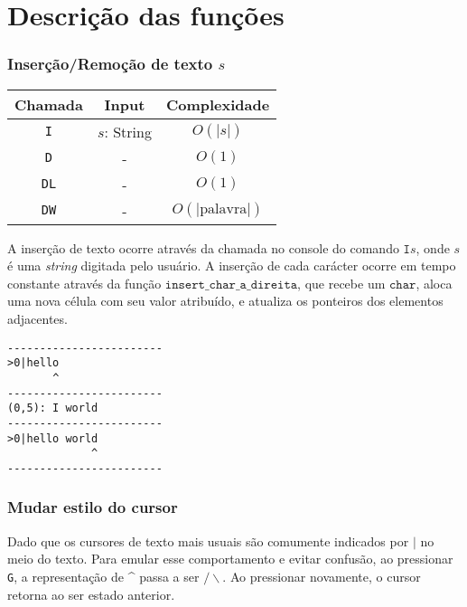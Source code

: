 \documentclass[a4paper, 11pt]{article}
\begin{document}
\section{Descrição das funções}

\subsubsection*{Inserção/Remoção de texto \texorpdfstring{$s$}{s}}

\begin{table}[H]
\centering
\begin{tabular}{|c|c|c|}
\hline
\textbf{Chamada} & \textbf{Input} & \textbf{Complexidade}
\\ 
\hline
\texttt{I} & $s$: String & $O(|s|)$ \\
\texttt{D} & - & $O(1)$ \\
\texttt{DL} & - & $O(1)$ \\
\texttt{DW} & - & $O(|\text{palavra}|)$ \\
\hline
\end{tabular}
\end{table}

A inserção de texto ocorre através da chamada no console do comando $\texttt{I}s$, onde $s$ é uma \textit{string} digitada pelo usuário. A inserção de cada carácter ocorre em tempo constante através da função $\texttt{insert\_char\_a\_direita}$, que recebe um $\texttt{char}$, aloca uma nova célula com seu valor atribuído, e atualiza os ponteiros dos elementos adjacentes.

\begin{center}
      \begin{minipage}{0.45\linewidth}
            \begin{lstlisting}[caption={Exemplo de Inserção de funções}, label={list_exemplo_de_insercao}, language={[ansi]C},firstnumber=1]
------------------------
>0|hello
       ^
------------------------
(0,5): I world
------------------------
>0|hello world
             ^
------------------------
            \end{lstlisting}
      \end{minipage}
\end{center}

\subsubsection*{Mudar estilo do cursor}

Dado que os cursores de texto mais usuais são comumente indicados por $\texttt{|}$ no meio do texto. Para emular esse comportamento e evitar confusão, ao pressionar \texttt{G}, a representação de \textasciicircum\,\,passa a ser $/\backslash$. Ao pressionar novamente, o cursor retorna ao ser estado anterior.
\end{document}
